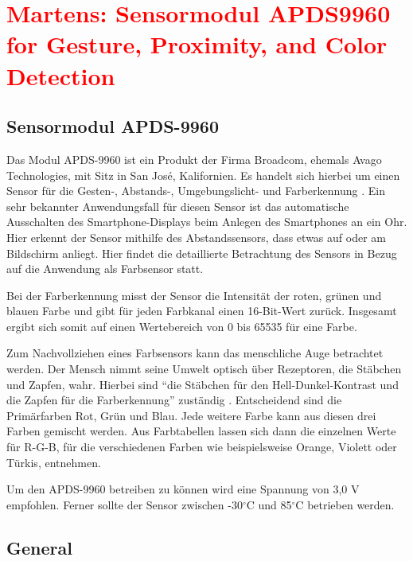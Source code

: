 %
%
%

\chapter{\textcolor{red}{Martens: Sensormodul APDS9960 for Gesture, Proximity, and Color Detection}}



\section{Sensormodul APDS-9960}

Das Modul APDS-9960 ist ein Produkt der Firma Broadcom, ehemals Avago Technologies, mit Sitz in San José, Kalifornien. Es handelt sich hierbei um einen Sensor für die Gesten-, Abstands-, Umgebungslicht- und Farberkennung \cite{Avago:2015}.  Ein sehr bekannter Anwendungsfall für diesen Sensor ist das automatische Ausschalten des Smartphone-Displays beim Anlegen des Smartphones an ein Ohr. Hier erkennt der Sensor mithilfe des Abstandssensors, dass etwas auf oder am Bildschirm anliegt. Hier findet die detaillierte Betrachtung des Sensors in Bezug auf die Anwendung als Farbsensor statt. 

Bei der Farberkennung misst der Sensor die Intensität der roten, grünen und blauen Farbe und gibt für jeden Farbkanal einen 16-Bit-Wert zurück. Insgesamt ergibt sich somit auf einen Wertebereich von 0 bis 65535 für eine Farbe. 

Zum Nachvollziehen eines Farbsensors kann das menschliche Auge betrachtet werden. Der Mensch nimmt seine Umwelt optisch über Rezeptoren, die Stäbchen und Zapfen, wahr. Hierbei sind ``die Stäbchen für den Hell-Dunkel-Kontrast und die Zapfen für die Farberkennung'' zuständig \cite{Hering:2017}. Entscheidend sind die Primärfarben Rot, Grün und Blau. Jede weitere Farbe kann aus diesen drei Farben gemischt werden. Aus Farbtabellen lassen sich dann die einzelnen Werte für R-G-B, für die verschiedenen Farben wie beispielsweise Orange, Violett oder Türkis, entnehmen. 

Um den APDS-9960 betreiben zu können wird eine Spannung von 3,0 V empfohlen. Ferner sollte der Sensor zwischen -30$^\circ$C und 85$^\circ$C betrieben werden.



\section{General}

